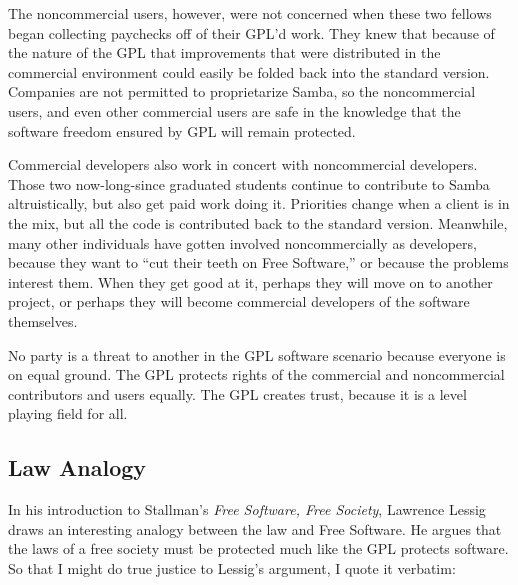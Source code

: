 The noncommercial users, however, were not concerned when these two
fellows began collecting paychecks off of their GPL'd work. They knew
that because of the nature of the GPL that improvements that were
distributed in the commercial environment could easily be folded back into
the standard version. Companies are not permitted to proprietarize
Samba, so the noncommercial users, and even other commercial users are
safe in the knowledge that the software freedom ensured by GPL will remain
protected.

Commercial developers also work in concert with noncommercial
developers. Those two now-long-since graduated students continue to
contribute to Samba altruistically, but also get paid work doing it.
Priorities change when a client is in the mix, but all the code is
contributed back to the standard version. Meanwhile, many other
individuals have gotten involved noncommercially as developers,
because they want to ``cut their teeth on Free Software,'' or because
the problems interest them. When they get good at it, perhaps they
will move on to another project, or perhaps they will become
commercial developers of the software themselves.

No party is a threat to another in the GPL software scenario because
everyone is on equal ground. The GPL protects rights of the commercial
and noncommercial contributors and users equally. The GPL creates trust,
because it is a level playing field for all.

\subsection{Law Analogy}

In his introduction to Stallman's \emph{Free Software, Free Society},
Lawrence Lessig draws an interesting analogy between the law and Free
Software. He argues that the laws of a free society must be protected
much like the GPL protects software. So that I might do true justice to
Lessig's argument, I quote it verbatim:

